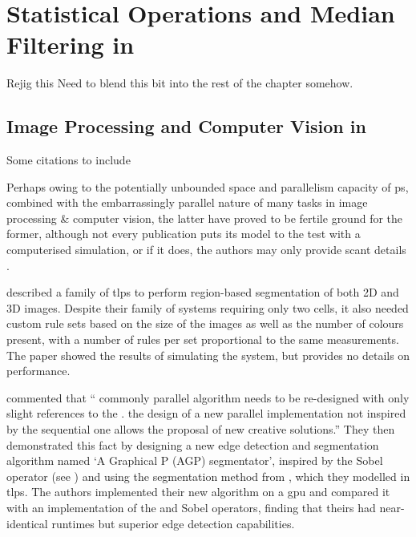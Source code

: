 \newcommand{\hopac}{Hopac}
\chapter{\label{chap:median}Statistical Operations and Median Filtering in }





\begin{anfxerror}{Rejig this}
Need to blend this bit into the rest of the chapter somehow.
\end{anfxerror}

\section{\label{subsec:imgprocpsys}Image Processing and Computer Vision in }
\begin{anfxwarning}{Some citations to include}
\cite{Zhang2012,Yuan2019}
\end{anfxwarning}

Perhaps owing to the potentially unbounded space and parallelism capacity of \gls{ps}, combined with the embarrassingly parallel nature of many tasks in image processing \& computer vision, the latter have proved to be fertile ground for the former, although not every publication puts its model to the test with a computerised simulation, or if it does, the authors may only provide scant details \cite{Diaz-Pernil2019}.

\citeauthor{Christinal2011} \cite{Christinal2011} described a family of \gls{tlps} to perform region-based segmentation of both 2D and 3D images.  Despite their family of systems requiring only two cells, it also needed custom rule sets based on the size of the images as well as the number of colours present, with a number of rules per set proportional to the same measurements.  The paper showed the results of simulating the system, but provides no details on performance.

\citeauthor{Diaz-Pernil2013} \cite{Diaz-Pernil2013} commented that \enquote{\textelp{} commonly  parallel algorithm needs to be re-designed with only slight references to the .  \textelp{} the design of a new parallel implementation not inspired by the sequential one allows \textelp{} the proposal of new creative solutions.}  They then demonstrated this fact by designing a new edge detection and segmentation algorithm named `A Graphical P (AGP) segmentator', inspired by the Sobel operator (see \eg{} \cite{Nixon2012}) and using the segmentation method from \cite{Christinal2011}, which they modelled in \gls{tlps}.  The authors implemented their new algorithm on a \gls{gpu} and compared it with an implementation of the  and  Sobel operators, finding that theirs had near-identical runtimes but superior edge detection capabilities.

